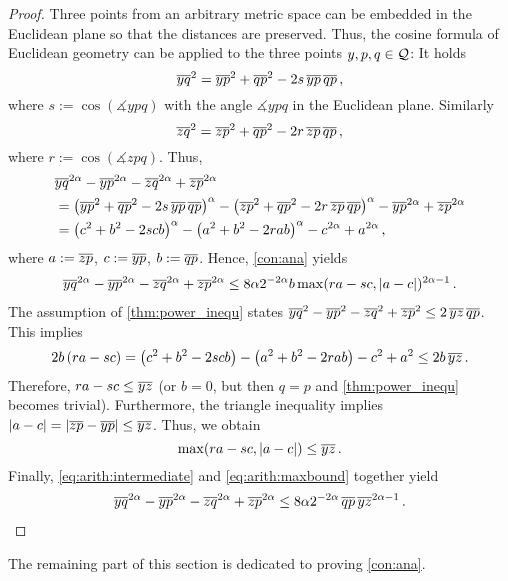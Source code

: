 \begin{proof}
	Three points from an arbitrary metric space can be embedded in the Euclidean plane so that the distances are preserved.
	Thus, the cosine formula of Euclidean geometry can be applied to the three points $y,p,q\in\mathcal{Q}$: It holds
	\begin{equation*}
		\overline{yq}^2 = \overline{yp}^2 + \overline{qp}^2 - 2 s \,\overline{yp}\, \overline{qp}\, ,
	\end{equation*}
	where $s := \cos(\measuredangle ypq)$ with the angle $\measuredangle ypq$ in the Euclidean plane.
	Similarly
	\begin{equation*}
		\overline{zq}^2 = \overline{zp}^2 + \overline{qp}^2 - 2 r \,\overline{zp}\, \overline{qp}
		\, ,
	\end{equation*}
	where $r := \cos(\measuredangle zpq)$. Thus,
	\begin{align*}
		&
		\overline{yq}^{2\alpha} - \overline{yp}^{2\alpha} - \overline{zq}^{2\alpha} + \overline{zp}^{2\alpha}
		\\&=
		\left( \overline{yp}^2 + \overline{qp}^2 - 2 s \,\overline{yp}\, \overline{qp} \right)^\alpha
		-
		\left( \overline{zp}^2 + \overline{qp}^2 - 2 r \,\overline{zp}\, \overline{qp} \right)^\alpha
		- \overline{yp}^{2\alpha}
		+ \overline{zp}^{2\alpha}
		\\&=
		\left( c^2 + b^2 - 2 s cb \right)^\alpha
		-
		\left( a^2 + b^2 - 2 r ab \right)^\alpha
		- c^{2\alpha}
		+ a^{2\alpha}
		\, ,
	\end{align*}
	where $a:=\overline{zp}$, $c:=\overline{yp}$, $b:=\overline{qp}$.
	Hence, \autoref{con:ana} yields
	\begin{align}\label{eq:arith:intermediate}
		\overline{yq}^{2\alpha} - \overline{yp}^{2\alpha} - \overline{zq}^{2\alpha} + \overline{zp}^{2\alpha}
		\leq
		8 \alpha 2^{-2\alpha} b \max(ra - sc, |a-c|)^{2\alpha-1}
		\, .
	\end{align}
	The assumption of \autoref{thm:power_inequ} states $\overline{yq}^{2} - \overline{yp}^{2} - \overline{zq}^{2} + \overline{zp}^{2} \leq 2 \, \overline{yz}\, \overline{qp}$.
	This implies
	\begin{equation*}
		2b \left( ra-sc \right)
		=
		\left( c^2 + b^2 - 2 scb \right)
		-
		\left( a^2 + b^2 - 2 rab \right)
		- c^{2}
		+ a^{2}
		\leq 
		2 b\,
		\overline{yz}
		\, .
	\end{equation*}
	Therefore, $ra-sc \leq \overline{yz}$ (or $b=0$, but then $q=p$ and \autoref{thm:power_inequ} becomes trivial).
	Furthermore, the triangle inequality implies $|a-c| = |\overline{zp}-\overline{yp}| \leq \overline{yz}$.
	Thus, we obtain
	\begin{equation}\label{eq:arith:maxbound}
		\max(ra - sc, |a-c|) \leq\overline{yz}
		\, .
	\end{equation}
	Finally, \eqref{eq:arith:intermediate} and \eqref{eq:arith:maxbound} together yield
	\begin{align*}
		\overline{yq}^{2\alpha} - \overline{yp}^{2\alpha} - \overline{zq}^{2\alpha} + \overline{zp}^{2\alpha}
		\leq
		8 \alpha 2^{-2\alpha}  \,\overline{qp}\, \overline{yz}^{2\alpha-1}
		\, .
	\end{align*}
\end{proof}
%
The remaining part of this section is dedicated to proving \autoref{con:ana}.

